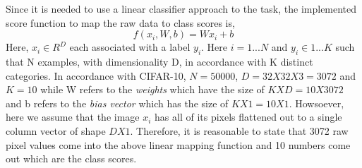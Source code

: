 \documentclass[11pt]{scrartcl}
\begin{document}
{\begin{enumerate}[label=(\alph*)]
Since it is needed to use a linear classifier approach to the task, the implemented score function to map the raw data to class scores is,
\begin{equation}
    f(x_i,W,b) = Wx_i + b
\end{equation}
Here, $x_i \in R^D$ each associated with a label $y_i$. Here $i=1...N$ and $y_i\in 1...K$ such that N examples, with dimensionality D, in accordance with K distinct categories. In accordance with CIFAR-10, $N=50000$, $D=32X32X3=3072$ and $K=10$ while W refers to the \textit{weights} which have the size of $KXD = 10X3072$ and b refers to the \textit{bias vector} which has the size of $KX1=10X1$. Howsoever, here we assume that the image $x_i$ has all of its pixels flattened out to a single column vector of shape $DX1$. Therefore, it is reasonable to state that 3072 raw pixel values come into the above linear mapping function and 10 numbers come out which are the class scores. 


\end{enumerate}}
\end{document}
